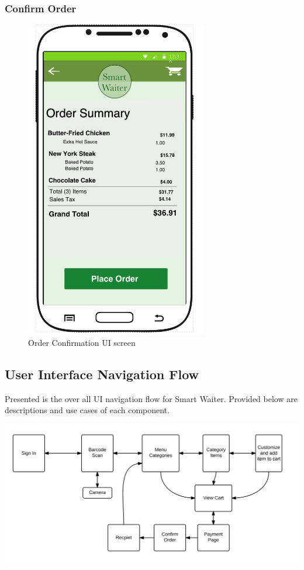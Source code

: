 \documentclass[12pt, titlepage]{article}
\begin{document}
\subsubsection{Confirm Order}
\begin{figure}[H]
\centering
\includegraphics[width=80mm,scale=0.5]{OrderSummary.png}
\caption{Order Confirmation UI screen}
\end{figure}

\subsection{User Interface Navigation Flow}
Presented is the over all UI navigation flow for Smart Waiter. Provided below are descriptions and use cases of each component. 

\includegraphics[width=180mm,scale=0.5]{UIProcess.png}
\end{document}
